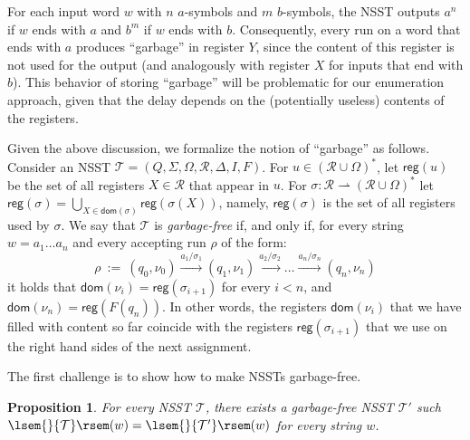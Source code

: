 \documentclass[
a4paper
]{article}
\theoremstyle{plain}
\newtheorem{proposition}[theorem]{Proposition}
\theoremstyle{definition}
\theoremstyle{remark}
\newcommand{\dom}{\operatorname{dom}}
\newcommand{\pmap}{\rightharpoonup}
\newcommand{\Reg}{\mathcal{R}}
\newcommand{\nsst}{\mathcal{T}}
\newcommand{\reg}{\operatorname{reg}}
\newcommand{\sem}[1]{{\lsem{}{#1}\rsem}}
\renewcommand{\operatorname}[1]{\textsf{#1}}
\begin{document}
For each input word $w$ with $n$ $a$-symbols and $m$ $b$-symbols, the NSST outputs $a^n$ if $w$ ends with $a$ and $b^m$ if $w$ ends with $b$. Consequently, every run on a word that ends with $a$ produces ``garbage'' in register $Y$, since the content of this register is not used for the output (and analogously with register $X$ for inputs that end with $b$).
This behavior of storing ``garbage'' will be problematic for our enumeration approach, given that the delay depends on the (potentially useless) contents of the registers.

Given the above discussion, we formalize
the notion of ``garbage''
as follows. 
Consider an NSST $\nsst = (Q, \Sigma, \Omega,  \Reg, \Delta, I, F)$.
For $u \in (\Reg \cup \Omega)^*$, let $\reg(u)$ be the set of all registers $X \in \Reg$ that appear in $u$.
For
$\sigma: \Reg \pmap (\Reg \cup \Omega)^*$ let $\reg(\sigma) = \bigcup_{X \in \dom(\sigma)} \reg(\sigma(X))$, namely,
$\reg(\sigma)$ is
the set of all registers used by $\sigma$.  
We say that $\nsst$ is \emph{garbage-free} if, and only if, for every string $w = a_1\ldots a_n$ and every accepting run $\rho$ of the form:
\begin{equation*}
	\rho \ := \ (q_0, \nu_0) \xrightarrow{a_1/\sigma_1} (q_1, \nu_1) \xrightarrow{a_2 /\sigma_2} \ldots \xrightarrow{a_n/\sigma_{n}} (q_{n}, \nu_n)
\end{equation*}
it holds that $\dom(\nu_i) = \reg(\sigma_{i+1})$ for every $i < n$, and $\dom(\nu_n) = \reg(F(q_n))$. In other words, the registers $\dom(\nu_i)$ that we have filled with content so far coincide with the registers $\reg(\sigma_{i+1})$ that we use on the right hand sides of the next assignment. 

The first challenge is to show how to make NSSTs garbage-free.
\begin{proposition}\label{prop:garbageFree}
	For every NSST $\nsst$, there exists a garbage-free NSST $\nsst'$ such $\sem{\nsst}(w) = \sem{\nsst'}(w)$ for every string $w$.
\end{proposition}
\end{document}
